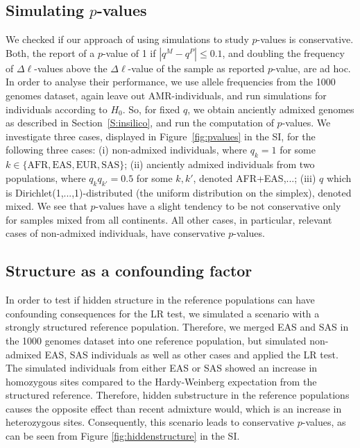 \documentclass[12pt]{article}
\theoremstyle{definition}
\begin{document}
{\color{blue}
\subsection{Simulating $p$-values}
\label{ss:pvalues}We checked if our approach of using simulations to study $p$-values is conservative. Both, the report of a $p$-value of 1 if $|q^M - q^P| \leq 0.1$, and doubling the frequency of $\Delta\ell$-values above the $\Delta\ell$-value of the sample as reported $p$-value, are ad hoc. In order to analyse their performance, we use allele frequencies from the 1000 genomes dataset, again leave out AMR-individuals, and run simulations for individuals according to $H_0$. So, for fixed $q$, we obtain anciently admixed genomes as described in Section~\ref{S:insilico}, and run the computation of $p$-values. We investigate three cases, displayed in Figure~\ref{fig:pvalues} in the SI, for the following three cases: (i) non-admixed individuals, where $q_k=1$ for some $k\in\{\text{AFR}, \text{EAS}, \text{EUR}, \text{SAS}\}$; (ii) anciently admixed individuals from two populations, where $q_k q_{k'} = 0.5$ for some $k, k'$, denoted AFR+EAS,...; (iii) $q$ which is Dirichlet(1,...,1)-distributed (the uniform distribution on the simplex), denoted mixed. We see that $p$-values have a slight tendency to be not conservative only for samples mixed from all continents. All other cases, in particular, relevant cases of non-admixed individuals, have conservative $p$-values.}

{\color{blue}
\subsection{Structure as a confounding factor}
In order to test if hidden structure in the reference populations can have confounding consequences for the LR test, we simulated a scenario with a strongly structured reference population. Therefore, we merged EAS and SAS in the 1000 genomes dataset into one reference population, but simulated non-admixed EAS, SAS individuals as well as other cases and applied the LR test. The simulated individuals from either EAS or SAS showed an increase in homozygous sites compared to the Hardy-Weinberg expectation from the structured reference. Therefore, hidden substructure in the reference populations causes the opposite effect than recent admixture would, which is an increase in heterozygous sites.  Consequently, this scenario leads to conservative $p$-values, as can be seen from Figure \ref{fig:hiddenstructure} in the SI.}
\end{document}
